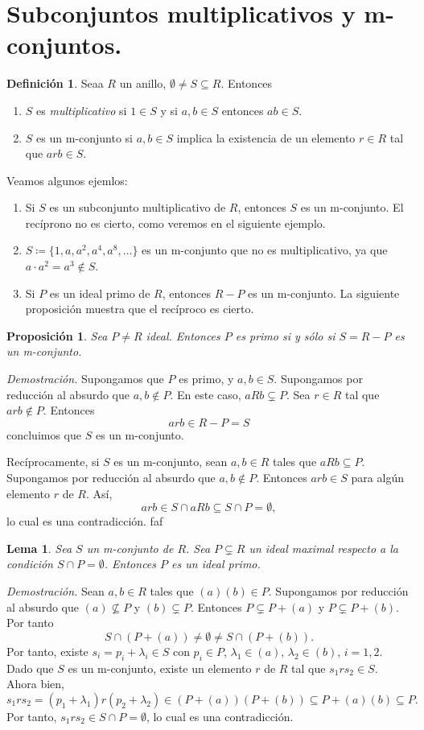 \documentclass[11pt]{book}
\newtheorem{lemma}[theorem]{Lema}
\newtheorem{prop}[theorem]{Proposición}
\theoremstyle{definition}
\newtheorem{definition}{Definición}[section]
\begin{document}
\section{Subconjuntos multiplicativos y m-conjuntos.}
\begin{definition}
    Seaa $R$ un anillo, $\emptyset\neq S\subseteq R$. Entonces\begin{enumerate}
        \item $S$ es \textit{multiplicativo} si $1\in S$ y si $a,b\in S$ entonces $ab\in S$.
        \item $S$ es un m-conjunto si $a,b\in S$ implica la existencia de un elemento $r\in R$ tal que $arb\in S$.
    \end{enumerate}
\end{definition}
Veamos algunos ejemlos:\begin{enumerate}
    \item Si $S$ es un subconjunto multiplicativo de $R$, entonces $S$ es un m-conjunto. El recíprono no es cierto, como veremos en el siguiente ejemplo.
    \item $S\coloneq\{1,a,a^2,a^4,a^8,\dots\}$ es un m-conjunto que no es multiplicativo, ya que $a\cdot a^2=a^3\notin S$.
    \item Si $P$ es un ideal primo de $R$, entonces $R-P$ es un m-conjunto. La siguiente proposición muestra que el recíproco es cierto.
\end{enumerate}
\begin{prop}
    Sea $P\neq R$ ideal. Entonces $P$ es primo si y sólo si $S=R-P$ es un m-conjunto.
\end{prop}
\noindent\textit{Demostración.} Supongamos que $P$ es primo, y $a,b\in S$. Supongamos por reducción al absurdo que $a,b\notin P$. En este caso, $aRb\subsetneq P$. Sea $r\in R$ tal que $arb\notin P$. Entonces\[
arb\in R-P=S
\]concluimos que $S$ es un m-conjunto.

Recíprocamente, si $S$ es un m-conjunto, sean $a,b\in R$ tales que $aRb\subseteq P$. Supongamos por reducción al absurdo que $a,b\notin P$. Entonces $arb\in S$ para algún elemento $r$ de $R$. Así,\[
arb\in S\cap aRb\subseteq S\cap P=\emptyset,
\]lo cual es una contradicción.
faf
\begin{lemma}\label{lema:condicion-primalidad-m-conjunto}
    Sea $S$ un m-conjunto de $R$. Sea $P\subsetneq R$ un ideal maximal respecto a la condición $S\cap P=\emptyset$. Entonces $P$ es un ideal primo.
\end{lemma}
\noindent\textit{Demostración.} Sean $a,b\in R$ tales que $(a)(b)\in P$. Supongamos por reducción al absurdo que $(a)\nsubseteq P$ y $(b)\subsetneq P$. Entonces $P\subsetneq P+(a)$ y $P\subsetneq P+(b)$. Por tanto\[
S\cap (P+(a))\neq \emptyset\neq S\cap (P+(b)).
\]Por tanto, existe $s_i=p_i+\lambda_i\in S$ con $p_i\in P$, $\lambda_1\in(a)$, $\lambda_2\in (b)$, $i=1,2$. Dado que $S$ es un m-conjunto, existe un elemento $r$ de $R$ tal que $s_1rs_2\in S$. Ahora bien,\[
s_1rs_2=(p_1+\lambda_1)r(p_2+\lambda_2)\in (P+(a))(P+(b))\subseteq P+(a)(b)\subseteq P.
\]Por tanto, $s_1rs_2\in S\cap P=\emptyset$, lo cual es una contradicción.
\end{document}
